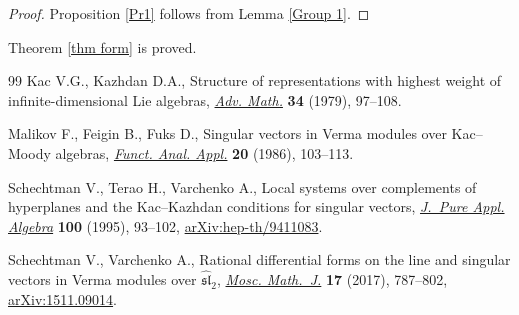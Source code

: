 \documentclass[11pt]{article}
\numberwithin{equation}{section}
\begin{document}
\begin{proof}
Proposition \ref{Pr1} follows from Lemma \ref{Group 1}.
\end{proof}

Theorem \ref{thm form} is proved.
\begin{thebibliography}{99}
Kac V.G., Kazhdan D.A., Structure of representations with highest weight of
 infinite-dimensional {L}ie algebras, \href{https://doi.org/10.1016/0001-8708(79)90066-5}{\textit{Adv. Math.}} \textbf{34} (1979), 97--108.

Malikov F., Feigin B., Fuks D., Singular vectors in {V}erma modules over
 {K}ac--{M}oody algebras, \href{https://doi.org/10.1007/BF01077264}{\textit{Funct. Anal. Appl.}} \textbf{20} (1986), 103--113.

Schechtman V., Terao H., Varchenko A., Local systems over complements of
 hyperplanes and the {K}ac--{K}azhdan conditions for singular vectors,
 \href{https://doi.org/10.1016/0022-4049(95)00014-N}{\textit{J.~Pure Appl. Algebra}} \textbf{100} (1995), 93--102,
 \href{https://arxiv.org/abs/hep-th/9411083}{arXiv:hep-th/9411083}.

Schechtman V., Varchenko A., Rational differential forms on the line and
 singular vectors in {V}erma modules over {$\widehat {\mathfrak{sl}}_2$},
 \href{https://doi.org/10.17323/1609-4514-2016-16-4-787-802}{\textit{Mosc. Math.~J.}} \textbf{17} (2017), 787--802, \href{https://arxiv.org/abs/1511.09014}{arXiv:1511.09014}.

\end{thebibliography}
\end{document}
